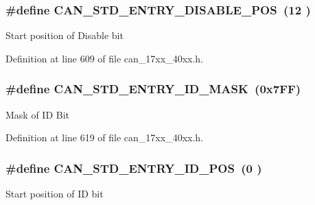 \subsubsection[{\texorpdfstring{C\+A\+N\+\_\+\+S\+T\+D\+\_\+\+E\+N\+T\+R\+Y\+\_\+\+D\+I\+S\+A\+B\+L\+E\+\_\+\+P\+OS}{CAN_STD_ENTRY_DISABLE_POS}}]{\setlength{\rightskip}{0pt plus 5cm}\#define C\+A\+N\+\_\+\+S\+T\+D\+\_\+\+E\+N\+T\+R\+Y\+\_\+\+D\+I\+S\+A\+B\+L\+E\+\_\+\+P\+OS~(12 )}\hypertarget{group__CAN__17XX__40XX_ga222c235d9fc30777d2380f5fcc843c8a}{}\label{group__CAN__17XX__40XX_ga222c235d9fc30777d2380f5fcc843c8a}
Start position of Disable bit 

Definition at line 609 of file can\+\_\+17xx\+\_\+40xx.\+h.

\subsubsection[{\texorpdfstring{C\+A\+N\+\_\+\+S\+T\+D\+\_\+\+E\+N\+T\+R\+Y\+\_\+\+I\+D\+\_\+\+M\+A\+SK}{CAN_STD_ENTRY_ID_MASK}}]{\setlength{\rightskip}{0pt plus 5cm}\#define C\+A\+N\+\_\+\+S\+T\+D\+\_\+\+E\+N\+T\+R\+Y\+\_\+\+I\+D\+\_\+\+M\+A\+SK~(0x7\+F\+F)}\hypertarget{group__CAN__17XX__40XX_ga29ad79d718c09251fa620d0eb979dd83}{}\label{group__CAN__17XX__40XX_ga29ad79d718c09251fa620d0eb979dd83}
Mask of ID Bit 

Definition at line 619 of file can\+\_\+17xx\+\_\+40xx.\+h.

\subsubsection[{\texorpdfstring{C\+A\+N\+\_\+\+S\+T\+D\+\_\+\+E\+N\+T\+R\+Y\+\_\+\+I\+D\+\_\+\+P\+OS}{CAN_STD_ENTRY_ID_POS}}]{\setlength{\rightskip}{0pt plus 5cm}\#define C\+A\+N\+\_\+\+S\+T\+D\+\_\+\+E\+N\+T\+R\+Y\+\_\+\+I\+D\+\_\+\+P\+OS~(0  )}\hypertarget{group__CAN__17XX__40XX_ga97b02bf9ac5d417eb24c951c8838257c}{}\label{group__CAN__17XX__40XX_ga97b02bf9ac5d417eb24c951c8838257c}
Start position of ID bit 

